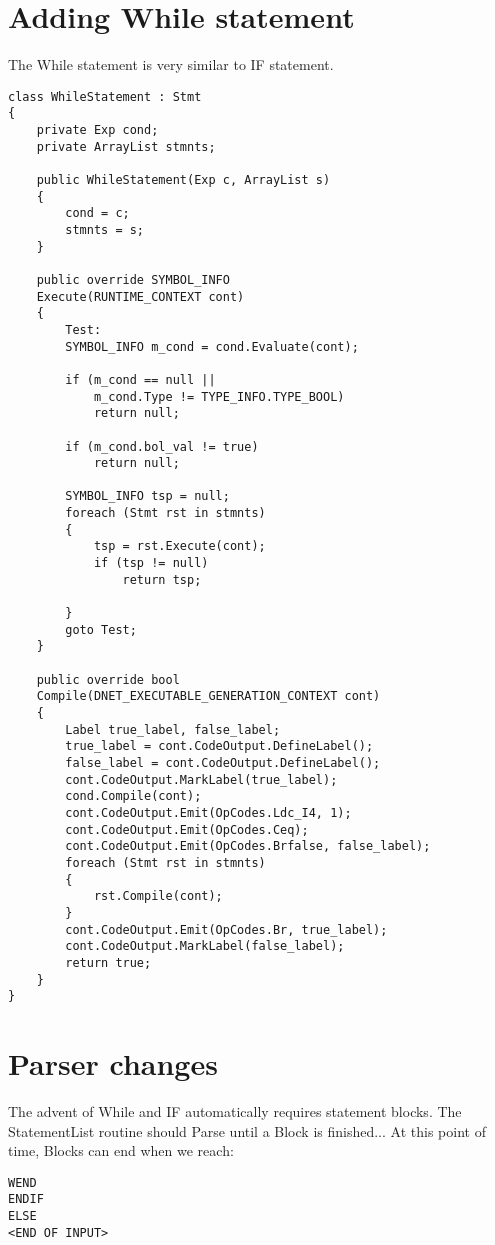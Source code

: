 \section{Adding While statement}
The While statement is very similar to IF statement.
\lstset{style=csharp}
\begin{lstlisting}
class WhileStatement : Stmt
{
	private Exp cond;
	private ArrayList stmnts;
	
	public WhileStatement(Exp c, ArrayList s)
	{
		cond = c;
		stmnts = s;
	}
	
	public override SYMBOL_INFO 
	Execute(RUNTIME_CONTEXT cont)
	{
		Test:
		SYMBOL_INFO m_cond = cond.Evaluate(cont);
		
		if (m_cond == null || 
			m_cond.Type != TYPE_INFO.TYPE_BOOL)
			return null;
			
		if (m_cond.bol_val != true)
			return null;
			
		SYMBOL_INFO tsp = null;
		foreach (Stmt rst in stmnts)
		{
			tsp = rst.Execute(cont);
			if (tsp != null)
				return tsp;
			
		}
		goto Test;
	}
	
	public override bool 
	Compile(DNET_EXECUTABLE_GENERATION_CONTEXT cont)
	{
		Label true_label, false_label;
		true_label = cont.CodeOutput.DefineLabel();
		false_label = cont.CodeOutput.DefineLabel();
		cont.CodeOutput.MarkLabel(true_label);
		cond.Compile(cont);
		cont.CodeOutput.Emit(OpCodes.Ldc_I4, 1);
		cont.CodeOutput.Emit(OpCodes.Ceq);
		cont.CodeOutput.Emit(OpCodes.Brfalse, false_label);
		foreach (Stmt rst in stmnts)
		{
			rst.Compile(cont);
		}
		cont.CodeOutput.Emit(OpCodes.Br, true_label);
		cont.CodeOutput.MarkLabel(false_label);
		return true;
	}
}
\end{lstlisting}
\section{Parser changes}
The advent of While and IF automatically requires statement blocks. The StatementList routine should Parse until a Block is finished...
At this point of time, Blocks can end when we reach:
\begin{verbatim}
WEND
ENDIF
ELSE
<END OF INPUT>
\end{verbatim}
